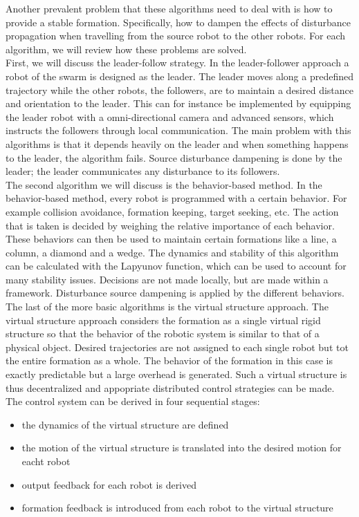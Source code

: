 Another prevalent problem that these algorithms need to deal with is how to provide a stable formation. 
Specifically, how to dampen the effects of disturbance propagation when travelling from the source robot to the other robots. 
For each algorithm, we will review how these problems are solved. \\

First, we will discuss the leader-follow strategy. 
In the leader-follower approach a robot of the swarm is designed as the leader.
The leader moves along a predefined trajectory while the other robots, the followers, are to maintain a desired distance and orientation to the leader. \cite{consolini2008leader}
This can for instance be implemented by equipping the leader robot with a omni-directional camera and advanced sensors, which instructs the followers through local communication. \cite{das2002vision}
The main problem with this algorithms is that it depends heavily on the leader and when something happens to the leader, the algorithm fails. 
Source disturbance dampening is done by the leader; the leader communicates any disturbance to its followers. \\

The second algorithm we will discuss is the behavior-based method. 
In the behavior-based method, every robot is programmed with a certain behavior.
For example collision avoidance, formation keeping, target seeking, etc. 
The action that is taken is decided by weighing the relative importance of each behavior. \cite{consolini2008leader}
These behaviors can then be used to maintain certain formations like a line, a column, a diamond and a wedge. \cite{balch1998behavior}
The dynamics and stability of this algorithm can be calculated with the Lapyunov function, which can be used to account for many stability issues. \cite{lawton2003decentralized}
Decisions are not made locally, but are made within a framework.
Disturbance source dampening is applied by the different behaviors. \\

The last of the more basic algorithms is the virtual structure approach. 
The virtual structure approach considers the formation as a single virtual rigid structure so that the behavior of the robotic system is similar to that of a physical object. 
Desired trajectories are not assigned to each single robot but tot the entire formation as a whole. 
The behavior of the formation in this case is exactly predictable but a large overhead is generated. \cite{consolini2008leader}
Such a virtual structure is thus decentralized and appopriate distributed control strategies can be made. \cite{ren2004decentralized}
The control system can be derived in four sequential stages: \cite{do2007nonlinear}
\begin{itemize}
	\item the dynamics of the virtual structure are defined
	\item the motion of the virtual structure is translated into the desired motion for eacht robot
	\item output feedback for each robot is derived
	\item formation feedback is introduced from each robot to the virtual structure
\end{itemize} 

